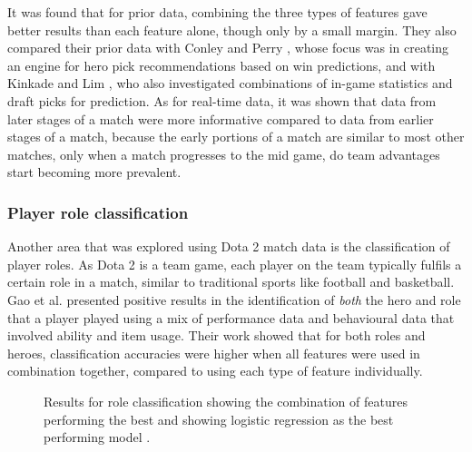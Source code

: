 \documentclass[Report.tex]{subfiles}
\begin{document}
It was found that for prior data, combining the three types of features gave better results than each feature alone, though only by a small margin. They also compared their prior data with Conley and Perry \cite{dota-conley}, whose focus was in creating an engine for hero pick recommendations based on win predictions, and with Kinkade and Lim \cite{dota-kinkade}, who also investigated combinations of in-game statistics and draft picks for prediction. As for real-time data, it was shown that data from later stages of a match were more informative compared to data from earlier stages of a match, because the early portions of a match are similar to most other matches, only when a match progresses to the mid game, do team advantages start becoming more prevalent.

\subsubsection{Player role classification}
Another area that was explored using Dota 2 match data is the classification of player roles. As Dota 2 is a team game, each player on the team typically fulfils a certain role in a match, similar to traditional sports like football and basketball. Gao et al. \cite{dota-gao} presented positive results in the identification of \textit{both} the hero and role that a player played using a mix of performance data and behavioural data that involved ability and item usage. Their work showed that for both roles and heroes, classification accuracies were higher when all features were used in combination together, compared to using each type of feature individually.

\begin{figure}[H]
\begin{subfigure}{0.45\textwidth}
\end{subfigure}
\hspace{\fill}
\begin{subfigure}{0.45\textwidth}
\end{subfigure}
\caption{Results for role classification showing the combination of features performing the best \cite{dota-gao} and showing logistic regression as the best performing model \cite{dota-eggert}.}
\end{figure}
\end{document}
